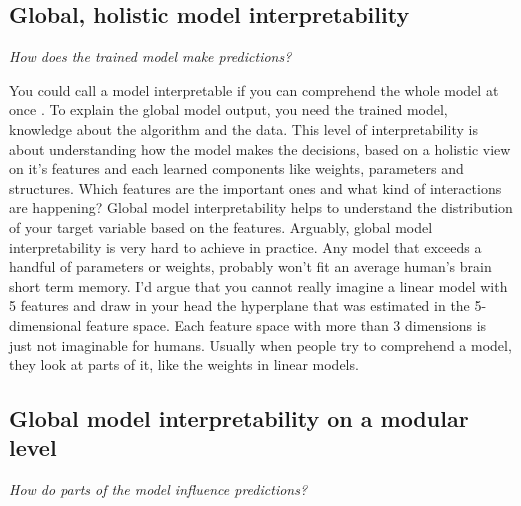 \documentclass[12pt,]{krantz}
\theoremstyle{definition}
\theoremstyle{definition}
\theoremstyle{definition}
\theoremstyle{remark}
\begin{document}
\subsection{Global, holistic model
interpretability}\label{global-holistic-model-interpretability}

\emph{How does the trained model make predictions?}

You could call a model interpretable if you can comprehend the whole
model at once \citep{Lipton2016}. To explain the global model output,
you need the trained model, knowledge about the algorithm and the data.
This level of interpretability is about understanding how the model
makes the decisions, based on a holistic view on it's features and each
learned components like weights, parameters and structures. Which
features are the important ones and what kind of interactions are
happening? Global model interpretability helps to understand the
distribution of your target variable based on the features. Arguably,
global model interpretability is very hard to achieve in practice. Any
model that exceeds a handful of parameters or weights, probably won't
fit an average human's brain short term memory. I'd argue that you
cannot really imagine a linear model with 5 features and draw in your
head the hyperplane that was estimated in the 5-dimensional feature
space. Each feature space with more than 3 dimensions is just not
imaginable for humans. Usually when people try to comprehend a model,
they look at parts of it, like the weights in linear models.

\subsection{Global model interpretability on a modular
level}\label{global-model-interpretability-on-a-modular-level}

\emph{How do parts of the model influence predictions?}
\end{document}
